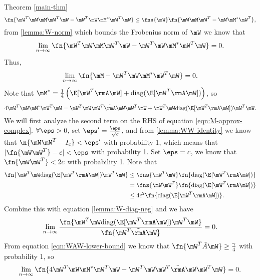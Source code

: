 \begin{proofof}{Theorem \cref{main-thm}}
\begin{equation}
    \fn{\mW^T\mW\mM \mW^T\mW-\mW^T\mW\mM^*\mW^T\mW}\leq \fns{\mW}\fn{\mW\mM \mW^T-\mW\mM^*\mW^T},
\end{equation}
from \cref{lemma:W-norm} which bounds the Frobenius norm of $\mW$ we know that
\begin{equation}
    \lim_{n\to\infty}\fn{\mW^T\mW\mM \mW^T\mW-\mW^T\mW\mM^*\mW^T\mW} = 0.
\end{equation}
Thus,
\begin{equation}
\label{eqn:M-equal-WTWMWTW}
    \lim_{n\to\infty}\fn{\mM-\mW^T\mW\mM^*\mW^T\mW} = 0.
\end{equation}
Note that $\mM^*=\frac14\left(\E[\mW^T\rmA\mW]+\text{diag}(\E[\mW^T\rmA\mW])\right)$, so
\begin{equation}
\label{eqn:M-approx-complex}
    4\mW^T\mW\mM^*\mW^T\mW = \mW^T\mW\mW^T\tilde{\rmA}\mW\mW^T\mW + \mW^T\mW\text{diag}(\E[\mW^T\rmA\mW])\mW^T\mW.
\end{equation}
We will first analyze the second term on the RHS of equation \cref{eqn:M-approx-complex}. $\forall\eps>0$, set $\eps'=\frac{\eps}{\sqrt{c}}$, and from \cref{lemma:WW-identity} we know that $\n{\mW\mW^T-I_c}<\eps'$ with probability 1, which means that $|\fn{\mW\mW^T}-c|<\eps$ with probability 1. Set $\eps=c$, we know that $\fn{\mW\mW^T}<2c$ with probability 1. Note that
\begin{equation}\begin{split}
    \fn{\mW^T\mW\text{diag}(\E[\mW^T\rmA\mW])\mW^T\mW} &\leq\fns{\mW^T\mW}\fn{\text{diag}(\E[\mW^T\rmA\mW])}\\
                                        &=\fns{\mW\mW^T}\fn{\text{diag}(\E[\mW^T\rmA\mW])}\\
                                        &\leq 4c^2\fn{\text{diag}(\E[\mW^T\rmA\mW])}.
\end{split}\end{equation}
Combine this with equation \cref{lemma:W-diag-neg} and we have
\begin{equation}
    \lim_{n\to\infty}\frac{\fn{\mW^T\mW\text{diag}(\E[\mW^T\rmA\mW])\mW^T\mW}}{\fn{\mW^T\tilde{\rmA}\mW}} = 0.
\end{equation}
From equation \cref{eqn:WAW-lower-bound} we know that $\fn{\mW^T\tilde{A}\mW}\geq\frac{\gamma}{4}$ with probability 1, so
\begin{equation}
\label{eqn:WTWMWTW-equal-WTWWTAWWTW}
    \lim_{n\to\infty}\fn{4\mW^T\mW\mM^*\mW^T\mW - \mW^T\mW\mW^T\tilde{\rmA}\mW\mW^T\mW} = 0.
\end{equation}

\end{proofof}
